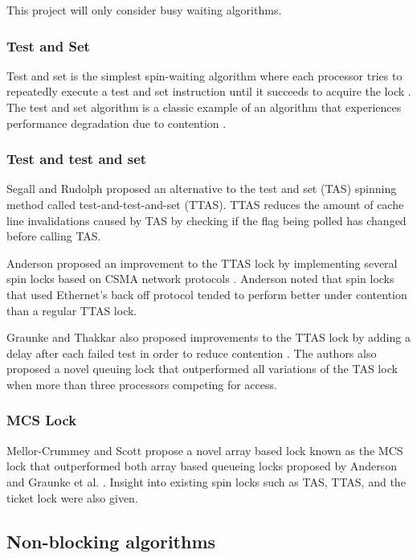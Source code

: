 \documentclass[a4paper, 12pt, titlepage]{article}
\begin{document}
\begin{singlespace}
This project will only consider busy waiting algorithms.

\subsubsection{Test and Set}
Test and set is the simplest spin-waiting algorithm where each processor tries to repeatedly execute a test and set instruction until it succeeds to acquire the lock \cite{anderson1990performance}. The test and set algorithm is a classic example of an algorithm that experiences performance degradation due to contention \cite{anderson1990performance, graunke1990synchronization,boyd2012non}.

\subsubsection{Test and test and set}
Segall and Rudolph \cite{rudolph1984dynamic} proposed an alternative to the test and set (TAS) spinning method called test-and-test-and-set (TTAS). 
TTAS reduces the amount of cache line invalidations caused by TAS by checking if the flag being polled has changed before calling TAS.

Anderson proposed an improvement to the TTAS lock by implementing several spin locks based on CSMA network protocols \cite{anderson1990performance}. Anderson noted that spin locks that used Ethernet's back off protocol tended to perform better under contention than a regular TTAS lock.

Graunke and Thakkar also proposed improvements to the TTAS lock by adding a delay after each failed test in order to reduce contention \cite{graunke1990synchronization}. The authors also proposed a novel queuing lock that outperformed all variations of the TAS lock when more than three processors competing for access.

\subsubsection{MCS Lock}
Mellor-Crummey and Scott propose a novel array based lock known as the MCS lock that outperformed both array based queueing locks proposed by Anderson and Graunke et al. \cite{mellor1991algorithms}. Insight into existing spin locks such as TAS, TTAS, and the ticket lock were also given.

\subsection{Non-blocking algorithms}

\end{singlespace}
\end{document}
